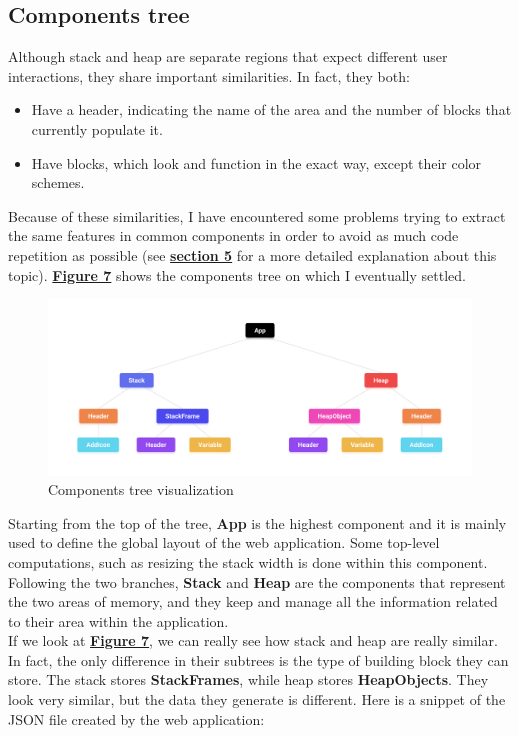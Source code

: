 \documentclass[]{usiinfbachelorproject}
\begin{document}
\subsection{Components tree}

Although stack and heap are separate regions that expect different user interactions, they share important similarities. In fact, they both:

\begin{itemize}
	\item Have a header, indicating the name of the area and the number of blocks that currently populate it.
	\item Have blocks, which look and function in the exact way, except their color schemes.
\end{itemize}

\noindent Because of these similarities, I have encountered some problems trying to extract the same features in common components in order to avoid as much code repetition as possible (see \hyperref[]{\textbf{section 5}} for a more detailed explanation about this topic). \hyperref[tree]{\textbf{Figure 7}} shows the components tree on which I eventually settled.

\begin{figure}[h!]
\centering
\includegraphics[width=\textwidth]{figures/tree.png}
\caption {Components tree visualization}
\label{tree}
\end{figure}

\pagebreak

\noindent Starting from the top of the tree, \textbf{App} is the highest component and it is mainly used to define the global layout of the web application. Some top-level computations, such as resizing the stack width is done within this component.\\
Following the two branches, \textbf{Stack} and \textbf{Heap} are the components that represent the two areas of memory, and they keep and manage all the information related to their area within the application.\\
If we look at \textbf{\hyperref[tree]{Figure 7}}, we can really see how stack and heap are really similar. In fact, the only difference in their subtrees is the type of building block they can store. The stack stores \textbf{StackFrames}, while heap stores \textbf{HeapObjects}. They look very similar, but the data they generate is different. Here is a snippet of the JSON file created by the web application:\\
\end{document}
